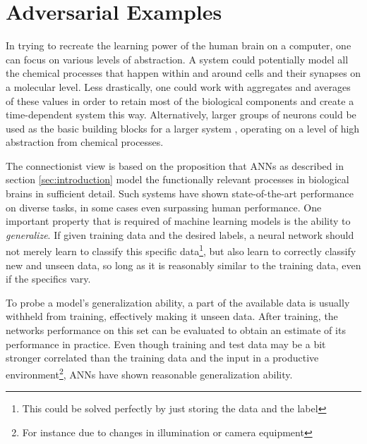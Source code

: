 \documentclass[11pt, a4paper]{article}
\begin{document}










\section{Adversarial Examples}
\label{sec:adversarial-examples}

In trying to recreate the learning power of the human brain on a computer, one can focus on various levels of abstraction. A system could potentially model all the chemical processes that happen within and around cells and their synapses on a molecular level. Less drastically, one could work with aggregates and averages of these values in order to retain most of the biological components and create a time-dependent system this way. Alternatively, larger groups of neurons could be used as the basic building blocks for a larger system \cite{dynamic-field-theory-movement-preparation}, operating on a level of high abstraction from chemical processes.

The connectionist view is based on the proposition that ANNs as described in section \ref{sec:introduction} model the functionally relevant processes in biological brains in sufficient detail. Such systems have shown state-of-the-art performance on diverse tasks, in some cases even surpassing human performance. One important property that is required of machine learning models is the ability to \emph{generalize}. If given training data and the desired labels, a neural network should not merely learn to classify this specific data\footnote{This could be solved perfectly by just storing the data and the label}, but also learn to correctly classify new and unseen data, so long as it is reasonably similar to the training data, even if the specifics vary.

To probe a model's generalization ability, a part of the available data is usually withheld from training, effectively making it unseen data. After training, the networks performance on this set can be evaluated to obtain an estimate of its performance in practice. Even though training and test data may be a bit stronger correlated than the training data and the input in a productive environment\footnote{For instance due to changes in illumination or camera equipment}, ANNs have shown reasonable generalization ability.
\end{document}
